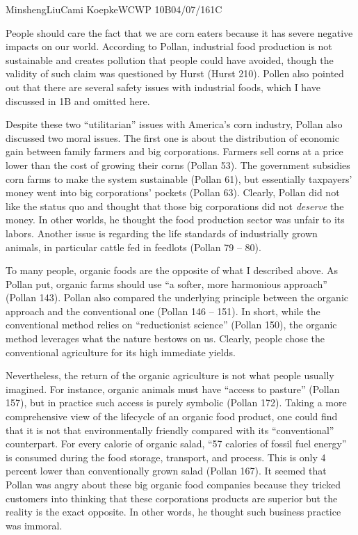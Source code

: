 \documentclass[12pt,letterpaper]{article}
\begin{document}
\begin{mla}{Minsheng}{Liu}{Cami Koepke}{WCWP 10B}{04/07/16}{1C}

People should care the fact that we are corn eaters because it has
severe negative impacts on our world. According to Pollan, industrial
food production is not sustainable and creates pollution that people
could have avoided, though the validity of such claim was questioned by
Hurst (Hurst 210). Pollen also pointed out that there are several safety
issues with industrial foods, which I have discussed in 1B and omitted
here.

Despite these two ``utilitarian'' issues with America's corn industry,
Pollan also discussed two moral issues. The first one is about the
distribution of economic gain between family farmers and big
corporations. Farmers sell corns at a price lower than the cost of
growing their corns (Pollan 53). The government subsidies corn farms to
make the system sustainable (Pollan 61), but essentially taxpayers'
money went into big corporations' pockets (Pollan 63). Clearly, Pollan
did not like the status quo and thought that those big corporations did
not \emph{deserve} the money. In other worlds, he thought the food
production sector was unfair to its labors. Another issue is regarding
the life standards of industrially grown animals, in particular cattle
fed in feedlots (Pollan 79 -- 80).

To many people, organic foods are the opposite of what I described
above. As Pollan put, organic farms should use ``a softer, more
harmonious approach'' (Pollan 143). Pollan also compared the underlying
principle between the organic approach and the conventional one (Pollan
146 -- 151). In short, while the conventional method relies on
``reductionist science'' (Pollan 150), the organic method leverages what
the nature bestows on us. Clearly, people chose the conventional
agriculture for its high immediate yields.

Nevertheless, the return of the organic agriculture is not what people
usually imagined. For instance, organic animals must have ``access to
pasture'' (Pollan 157), but in practice such access is purely symbolic
(Pollan 172). Taking a more comprehensive view of the lifecycle of an
organic food product, one could find that it is not that environmentally
friendly compared with its ``conventional'' counterpart. For every
calorie of organic salad, ``57 calories of fossil fuel energy'' is
consumed during the food storage, transport, and process. This is only 4
percent lower than conventionally grown salad (Pollan 167). It seemed
that Pollan was angry about these big organic food companies because
they tricked customers into thinking that these corporations products
are superior but the reality is the exact opposite. In other words, he
thought such business practice was immoral.


\end{mla}
\end{document}
